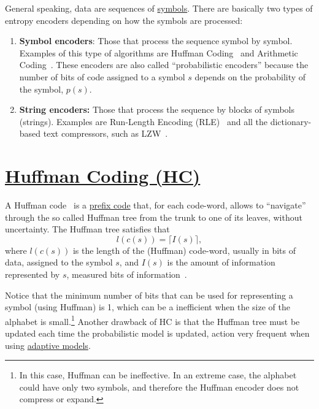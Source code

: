 General speaking, data are sequences of
\href{https://en.wikipedia.org/wiki/Symbol}{symbols}. There are
basically two types of entropy encoders depending on how the symbols
are processed:

\begin{enumerate}
\item \textbf{Symbol encoders}: Those that process the sequence symbol
  by symbol. Examples of this type of algorithms are Huffman
  Coding~\cite{vruiz__huffman_coding} and Arithmetic
  Coding~\cite{vruiz__arithmetic_coding}. These encoders are also
  called ``probabilistic encoders'' because the number of bits of code
  assigned to a symbol $s$ depends on the probability of the symbol,
  $p(s)$.
\item \textbf{String encoders:} Those that process the sequence by
  blocks of symbols (strings). Examples are Run-Length Encoding
  (RLE)~\cite{vruiz__rle} and all the dictionary-based text
  compressors, such as LZW~\cite{vruiz__LZW}.
\end{enumerate}

\begin{comment}
The encoders of the first type generally achieve more compact
representations (from a pure Entropy perspective, i.e., without reducing the number of symbols), but are computationally more expensive. The
algorithms of the second class are usually faster, but slightly worse
in compression ratio.
\end{comment}

\section{\href{https://en.wikipedia.org/wiki/Huffman_coding}{Huffman Coding (HC)}}

A Huffman code~\cite{vruiz__huffman_coding,ruiz2000compresion} is a
\href{https://en.wikipedia.org/wiki/Prefix_code}{prefix code} that,
for each code-word, allows to ``navigate'' through the so called
Huffman tree from the trunk to one of its leaves, without
uncertainty. The Huffman tree satisfies that
\begin{equation}
  l(c(s)) = \lceil I(s)\rceil,
  \label{eq:huffman_performance}
\end{equation}
where $l(c(s))$ is the length of the (Huffman) code-word, usually in
bits of data, assigned to the symbol $s$, and $I(s)$ is the amount of
information represented by $s$, measured bits of
information~\cite{vruiz__information_theory}.

Notice that the minimum number of bits that can be used for
representing a symbol (using Huffman) is 1, which can be a inefficient
when the size of the alphabet is small.\footnote{In this case,
  Huffman can be ineffective. In an extreme case, the alphabet could
  have only two symbols, and therefore the Huffman encoder does not
  compress or expand.} Another drawback of HC is that the Huffman tree
must be updated each time the probabilistic model is updated, action
very frequent when using
\href{https://en.wikipedia.org/wiki/Adaptive_Huffman_coding}{adaptive
  models}.

